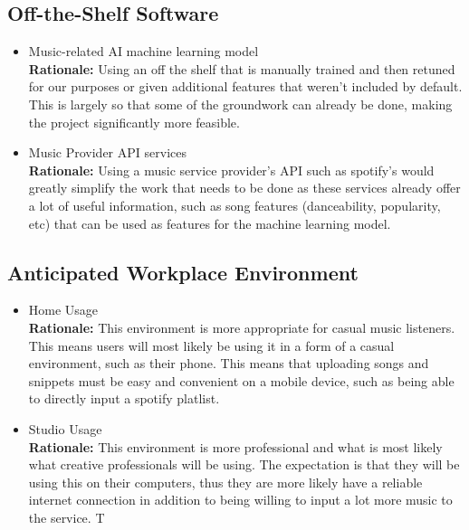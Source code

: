 \documentclass[12pt]{article}
\begin{document}
\subsection{Off-the-Shelf Software}
\begin{itemize}
  \item Music-related AI machine learning model
  \\ \textbf{Rationale:} Using an off the shelf that is manually trained and then retuned
  for our purposes or given additional features that weren't included by default. This is largely
  so that some of the groundwork can already be done, making the project significantly more
  feasible. 

  \item Music Provider API services 
  \\ \textbf{Rationale:} Using a music service provider's API such as spotify's would 
  greatly simplify the work that needs to be done as these services already offer a lot of useful
  information, such as song features (danceability, popularity, etc) that can be used as 
  features for the machine learning model. 

\end{itemize}

\subsection{Anticipated Workplace Environment}
\begin{itemize}
  \item Home Usage
  \\ \textbf{Rationale:} This environment is more appropriate for casual music listeners. 
  This means users will most likely be using it in a form of a casual environment, such as their phone.
  This means that uploading songs and snippets must be easy and convenient on a mobile device, such 
  as being able to directly input a spotify platlist. 

  \item Studio Usage
  \\ \textbf{Rationale:} This environment is more professional and what is most likely what 
  creative professionals will be using. The expectation is that they will be using this on their 
  computers, thus they are more likely have a reliable internet connection in addition to being
  willing to input a lot more music to the service. T

\end{itemize}
\end{document}
